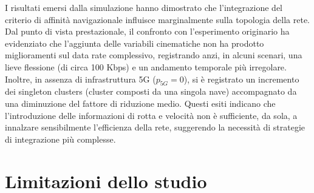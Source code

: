 I risultati emersi dalla simulazione hanno dimostrato che l'integrazione del criterio di affinità navigazionale influisce marginalmente sulla topologia della rete. Dal punto di vista prestazionale, il confronto con l'esperimento originario ha evidenziato che l'aggiunta delle variabili cinematiche non ha prodotto miglioramenti sul data rate complessivo, registrando anzi, in alcuni scenari, una lieve flessione (di circa 100 Kbps) e un andamento temporale più irregolare. Inoltre, in assenza di infrastruttura 5G ($p_{5G} = 0$), si è registrato un incremento dei singleton clusters (cluster composti da una singola nave) accompagnato da una diminuzione del fattore di riduzione medio. Questi esiti indicano che l'introduzione delle informazioni di rotta e velocità non è sufficiente, da sola, a innalzare sensibilmente l'efficienza della rete, suggerendo la necessità di strategie di integrazione più complesse.

\section{Limitazioni dello studio}
\label{sec:limitazioni_studio}

